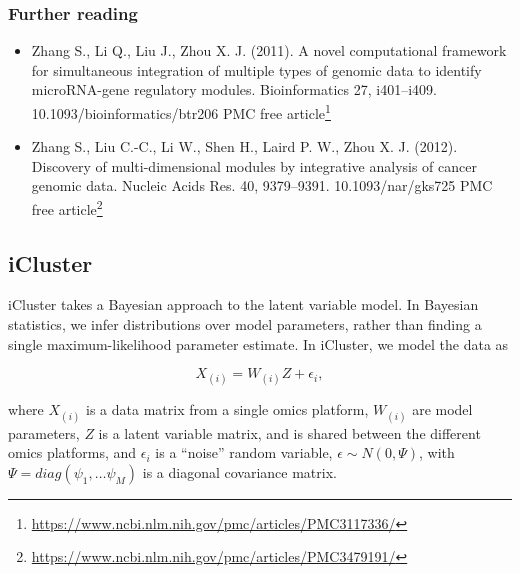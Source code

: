 \documentclass[12pt,]{krantz}
\providecommand{\tightlist}{%
  \setlength{\itemsep}{0pt}\setlength{\parskip}{0pt}}
\renewcommand{\href}[2]{#2\footnote{\url{#1}}}
\begin{document}
\hypertarget{further-reading-1}{%
\subsubsection{Further reading}\label{further-reading-1}}

\begin{itemize}
\tightlist
\item
  Zhang S., Li Q., Liu J., Zhou X. J. (2011). A novel computational framework for simultaneous integration of multiple types of genomic data to identify microRNA-gene regulatory modules. Bioinformatics 27, i401--i409. 10.1093/bioinformatics/btr206 \href{https://www.ncbi.nlm.nih.gov/pmc/articles/PMC3117336/}{PMC free article}
\item
  Zhang S., Liu C.-C., Li W., Shen H., Laird P. W., Zhou X. J. (2012). Discovery of multi-dimensional modules by integrative analysis of cancer genomic data. Nucleic Acids Res. 40, 9379--9391. 10.1093/nar/gks725 \href{https://www.ncbi.nlm.nih.gov/pmc/articles/PMC3479191/}{PMC free article}
\end{itemize}

\hypertarget{icluster}{%
\subsection{iCluster}\label{icluster}}

iCluster takes a Bayesian approach to the latent variable model. In Bayesian statistics, we infer distributions over model parameters, rather than finding a single maximum-likelihood parameter estimate. In iCluster, we model the data as

\[
X_{(i)} = W_{(i)}Z + \epsilon_i,
\]

where \(X_{(i)}\) is a data matrix from a single omics platform, \(W_{(i)}\) are model parameters, \(Z\) is a latent variable matrix, and is shared between the different omics platforms, and \(\epsilon_i\) is a ``noise'' random variable, \(\epsilon \sim N(0,\Psi)\), with \(\Psi = diag(\psi_1,\dots \psi_M)\) is a diagonal covariance matrix.
\end{document}
